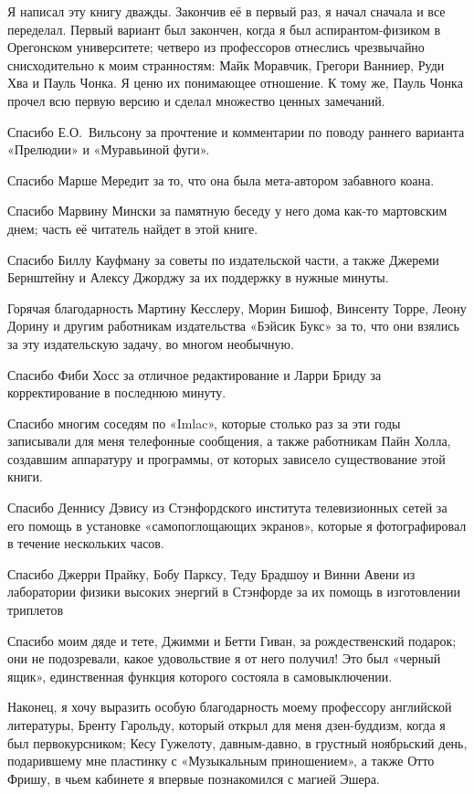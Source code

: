 \documentclass[../main.tex]{subfiles}
\begin{document}
Я написал эту книгу дважды. Закончив её в первый раз, я начал сначала и все переделал. Первый вариант был закончен, когда я был аспирантом-физиком в Орегонском университете; четверо из профессоров отнеслись чрезвычайно снисходительно к моим странностям: Майк Моравчик, Грегори Ванниер, Руди Хва и Пауль Чонка. Я ценю их понимающее отношение. К тому же, Пауль Чонка прочел всю первую версию и сделал множество ценных замечаний.

Спасибо Е.О.~Вильсону за прочтение и комментарии по поводу раннего варианта «Прелюдии» и «Муравьиной фуги».

Спасибо Марше Мередит за то, что она была мета-автором забавного коана.

Спасибо Марвину Мински за памятную беседу у него дома как-то мартовским днем; часть её читатель найдет в этой книге.

Спасибо Биллу Кауфману за советы по издательской части, а также Джереми Бернштейну и Алексу Джорджу за их поддержку в нужные минуты.

Горячая благодарность Мартину Кесслеру, Морин Бишоф, Винсенту Торре, Леону Дорину и другим работникам издательства «Бэйсик Букс» за то, что они взялись за эту издательскую задачу, во многом необычную.

Спасибо Фиби Хосс за отличное редактирование и Ларри Бриду за корректирование в последнюю минуту.

Спасибо многим соседям по «Imlac», которые столько раз за эти годы записывали для меня телефонные сообщения, а также работникам Пайн Холла, создавшим аппаратуру и программы, от которых зависело существование этой книги.

Спасибо Деннису Дэвису из Стэнфордского института телевизионных сетей за его помощь в установке «самопоглощающих экранов», которые я фотографировал в течение нескольких часов.

Спасибо Джерри Прайку, Бобу Парксу, Теду Брадшоу и Винни Авени из лаборатории физики высоких энергий в Стэнфорде за их помощь в изготовлении триплетов

Спасибо моим дяде и тете, Джимми и Бетти Гиван, за рождественский подарок; они не подозревали, какое удовольствие я от него получил!
Это был «черный ящик», единственная функция которого состояла в самовыключении.

Наконец, я хочу выразить особую благодарность моему профессору английской литературы, Бренту Гарольду, который открыл для меня дзен-буддизм, когда я был первокурсником; Кесу Гужелоту, давным-давно, в грустный ноябрьский день, подарившему мне пластинку с «Музыкальным приношением», а также Отто Фришу, в чьем кабинете я впервые познакомился с магией Эшера.
\end{document}
